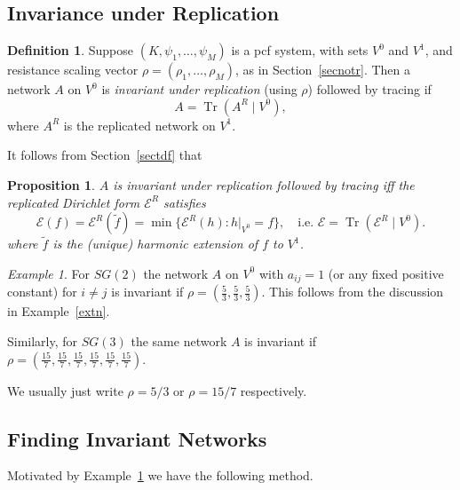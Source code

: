 \documentclass[a4paper]{amsart}
\theoremstyle{plain}
\newtheorem{proposition}[theorem]{Proposition}
\theoremstyle{definition}
\newtheorem{definition}[theorem]{Definition}%
\theoremstyle{remark}
\newtheorem{example}[theorem]{Example}
\DeclareMathOperator{\Tr}{Tr}
\begin{document}
  
\subsection{Invariance under Replication} \label{secir}
  \begin{definition} Suppose $ (K,\psi_1,\dots, \psi_M) $ is a pcf system, with sets $ V^{0} $ and $ V^{1} $, and resistance scaling vector $ \rho = (\rho_1,\dots, \rho_M ) $,  as in Section~\ref{secnotr}.  Then a network $ A $ on $  V^{0} $ is \emph{invariant under replication} (using   $ \rho$) followed by tracing if
 \begin{equation} \label{dfir}  
 \boxed{A = \Tr (A^R\mid V^{0}),}
 \end{equation} 
  where $ A^R $ is the replicated network on $  V^{1} $.
 \end{definition}

It follows from Section~\ref{sectdf} that 
\begin{proposition} $ A $ is invariant under replication followed by tracing iff the replicated Dirichlet form $ \mathcal{E} ^R $ satisfies
\begin{equation} \label{} 
\mathcal{E} (f)  = \mathcal{E} ^R(\widetilde{f}) = \min\{\mathcal{E} ^R (h) : h|_{V^{0}}  = f \},\quad 
\text{i.e.\ } \boxed{ \mathcal{E} = \Tr ( \mathcal{E} ^R \mid V^{0} )}.
  \end{equation} 
   where $ \widetilde{f} $ is the (unique) harmonic extension of $ f $ to $ V^{1} $.
\end{proposition}   
  
  
  \begin{example} \label{extn2} For $ SG(2) $ the network $ A $ on $ V^{0} $ with $ a_{ij} = 1 $  (or any fixed positive constant) for $ i\neq j $ is invariant if $ \rho = (\frac{5}{3}, \frac{5}{3}, \frac{5}{3}  ) $.  This follows from the discussion in  Example~\ref{extn}.
  
  Similarly, for $ SG(3)$ the same network $ A $ is invariant if $ \rho = (\frac{15}{7}, \frac{15}{7}, \frac{15}{7}, \frac{15}{7}, \frac{15}{7}, \frac{15}{7} ) $.
  
  We usually just write $ \rho = 5/3  $ or $ \rho = 15/7 $ respectively.

  \end{example} 
  
  
\subsection{Finding Invariant Networks}  \label{secfin} Motivated by Example~\ref{extn2} we have the following method.
\end{document}
